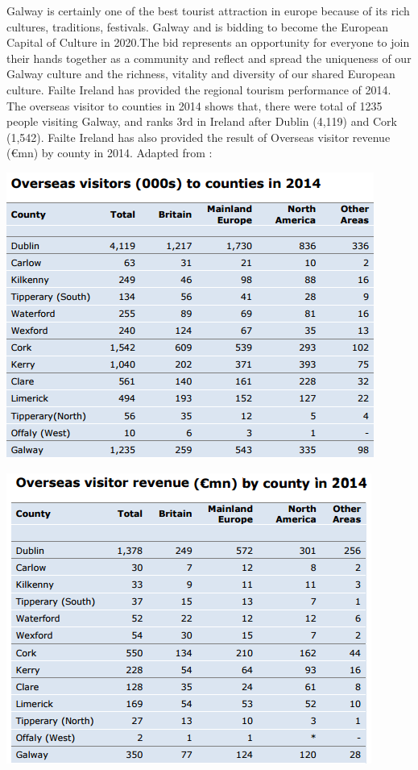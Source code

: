 \cite{galway20} Galway is certainly one of the best tourist attraction in europe because of its rich cultures, traditions, festivals. Galway  and is bidding to become the European Capital of Culture in 2020.The bid represents an opportunity for everyone to join their hands together as a community and reflect and spread the uniqueness of our Galway culture and the richness, vitality and diversity of our shared European culture. \cite{failteireland}Failte Ireland has provided the regional tourism performance of 2014.  The overseas visitor to counties in 2014 shows that, there were total of 1235 people visiting Galway, and ranks 3rd in Ireland after Dublin (4,119) and Cork (1,542). Failte Ireland  has also provided the result of Overseas visitor revenue  (€mn) by county in 2014.  Adapted from : 

\begin{center}    
	\includegraphics{img/statsgalway.PNG}
\end{center}
\begin{center}    
	\includegraphics{img/revenue.PNG}
\end{center}



